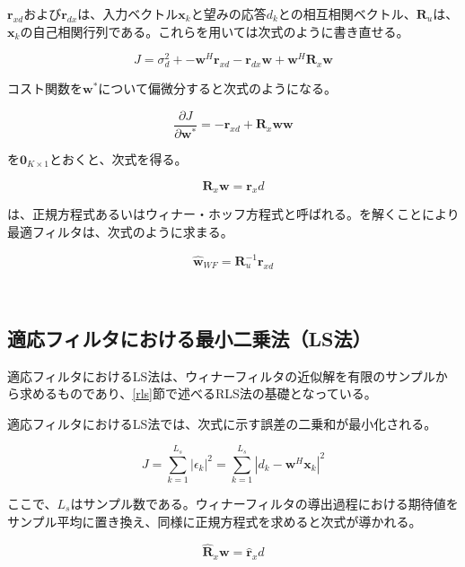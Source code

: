 \(\bm{r}_{xd}\)および\(\bm{r}_{dx}\)は、入力ベクトル\(\bm{x}_k\)と望みの応答\(d_k\)との相互相関ベクトル、\(\bm{R}_u\)は、\(\bm{x}_k\)の自己相関行列である。これらを用いては次式のように書き直せる。

\begin{equation}
J =\sigma_d^2 + - \bm{w}^H \bm{r}_{xd} -\bm{r}_{dx} \bm{w} + \bm{w}^H \bm{R}_x \bm{w}
\label{equ:J_sigma}
\end{equation}

コスト関数を\(\bm{w}^*\)について偏微分すると次式のようになる。

\begin{equation}
\frac{\partial J}{\partial \bm{w}^*} = - \bm{r}_{xd} + \bm{R}_x \bm{w}
\bm{w}
\label{equ:J_partial}
\end{equation}

を\(\bm{0}_{K \times 1}\)とおくと、次式を得る。

\begin{equation}
\bm{R}_x \bm{w} = \bm{r}_xd
\label{equ:Rwr}
\end{equation}

は、正規方程式あるいはウィナー・ホッフ方程式と呼ばれる。を解くことにより最適フィルタは、次式のように求まる\cite{signal_processing_for_array}。

\begin{equation}
\hat{\bm{w}}_{WF} = \bm{R}_u^{-1} \bm{r}_{xd}
\end{equation}

\
\subsection{適応フィルタにおける最小二乗法（LS法）}\label{ls}

適応フィルタにおけるLS法は、ウィナーフィルタの近似解を有限のサンプルから求めるものであり、\ref{rls}節で述べるRLS法の基礎となっている。

適応フィルタにおけるLS法では、次式に示す誤差の二乗和が最小化される。

\begin{equation}
J = \sum_{k=1}^{L_s} |\epsilon_k|^2 = \sum_{k=1}^{L_s} |d_k - \bm{w}^H \bm{x}_k|^2
\end{equation}

ここで、\(L_s\)はサンプル数である。ウィナーフィルタの導出過程における期待値をサンプル平均に置き換え、同様に正規方程式を求めると次式が導かれる。

\begin{equation}
\hat{\bm{R}}_x \bm{w} = \hat{\bm{r}}_xd
\end{equation}

